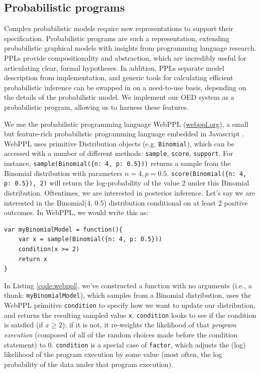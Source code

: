 \documentclass{article}
\begin{document}
\subsection{Probabilistic programs}

Complex probabilistic models require new representations to support their specification. Probabilistic programs are such a representation, extending probabilistic graphical models with insights from programming language research.
PPLs provide compositionality and abstraction, which are incredibly useful for articulating clear, formal hypotheses. In addition, PPLs separate model description from implementation, and generic tools for calculating efficient probabilistic inference can be swapped in on a need-to-use basis, depending on the details of the probabilistic model.
We implement our OED system as a probabilistic program, allowing us to harness these features.

We use the probabilistic programming language WebPPL (\url{webppl.org}), a small but feature-rich probabilistic programming language embedded in Javascript \cite{dippl}.
WebPPL uses primitive Distribution objects (e.g. \lstinline{Binomial}), which can be accessed with a number of different methods: \lstinline{sample}, \lstinline{score}, \lstinline{support}.
For instance, \lstinline|sample(Binomial({n: 4, p: 0.5}))| returns a sample from the Binomial distribution with parameters $n=4, p = 0.5$. \lstinline|score(Binomial({n: 4, p: 0.5}), 2)| will return the log-probability of the value 2 under this Binomial distribution.
Oftentimes, we are interested in posterior inference. Let's say we are interested in the Binomial(4, 0.5) distribution conditional on at least 2 positive outcomes. In WebPPL, we would write this as:
%
\begin{lstlisting}[mathescape, label={code:webppl}, caption = {Posterior inference in WebPPL.}]
var myBinomialModel = function(){
	var x = sample(Binomial({n: 4, p: 0.5}))
	condition(x >= 2)
	return x
}
\end{lstlisting}
%
In Listing \ref{code:webppl}, we've constructed a function with no arguments (i.e., a thunk: \lstinline{myBinomialModel}), which samples from a Binomial distribution, uses the WebPPL primitive \lstinline{condition} to specify how we want to update our distribution, and returns the resulting sampled value \lstinline{x}.
\lstinline{condition} looks to see if the condition is satsfied (if $x\geq2$); if it is not, it re-weights the likelihood of that \emph{program execution} (composed of all of the random choices made before the condition statement) to 0.
\lstinline{condition} is a special case of \lstinline{factor}, which adjusts the (log) likelihood of the program execution by some value (most often, the log probability of the data under that program execution).
\end{document}
